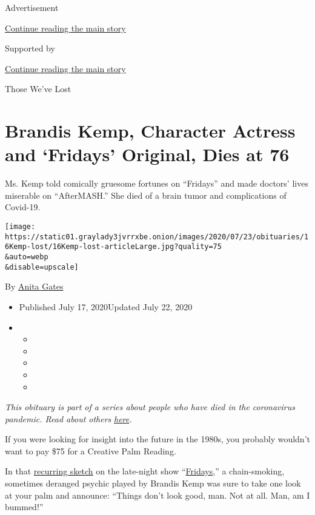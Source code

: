 Advertisement

\protect\hyperlink{after-top}{Continue reading the main story}

Supported by

\protect\hyperlink{after-sponsor}{Continue reading the main story}

Those We've Lost

\hypertarget{brandis-kemp-character-actress-and-fridays-original-dies-at-76}{%
\section{Brandis Kemp, Character Actress and `Fridays' Original, Dies at
76}\label{brandis-kemp-character-actress-and-fridays-original-dies-at-76}}

Ms. Kemp told comically gruesome fortunes on ``Fridays'' and made
doctors' lives miserable on ``AfterMASH.'' She died of a brain tumor and
complications of Covid-19.

\texttt{[image: https://static01.graylady3jvrrxbe.onion/images/2020/07/23/obituaries/16Kemp-lost/16Kemp-lost-articleLarge.jpg?quality=75\\\&auto=webp\\\&disable=upscale]}

By \href{https://www.nytimes3xbfgragh.onion/by/anita-gates}{Anita Gates}

\begin{itemize}
\item
  Published July 17, 2020Updated July 22, 2020
\item
  \begin{itemize}
  \item
  \item
  \item
  \item
  \item
  \end{itemize}
\end{itemize}

\emph{This obituary is part of a series about people who have died in
the coronavirus pandemic. Read about others}
\href{https://www.nytimes3xbfgragh.onion/interactive/2020/obituaries/people-died-coronavirus-obituaries.html}{\emph{here}}\emph{.}

If you were looking for insight into the future in the 1980s, you
probably wouldn't want to pay \$75 for a Creative Palm Reading.

In that \href{https://www.youtube.com/watch?v=AzWfAdgnMXw}{recurring
sketch} on the late-night show
``\href{https://www.vulture.com/2012/01/fridays-the-snl-ripoff-that-nearly-surpassed-the-original.html}{Fridays},''
a chain-smoking, sometimes deranged psychic played by Brandis Kemp was
sure to take one look at your palm and announce: ``Things don't look
good, man. Not at all. Man, am I bummed!''

